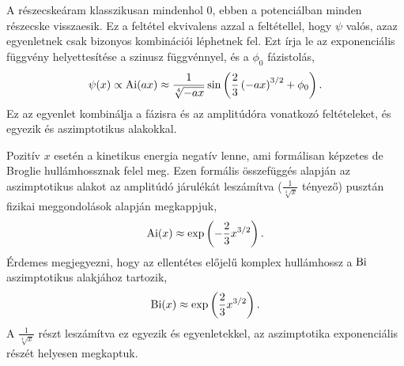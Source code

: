 A részecskeáram klasszikusan mindenhol $0$, ebben a potenciálban minden részecske visszaesik. Ez a feltétel ekvivalens azzal a feltétellel, hogy $\psi$ valós, azaz  egyenletnek csak bizonyos kombinációi léphetnek fel. Ezt írja le az exponenciális függvény helyettesítése a szinusz függvénnyel, és a $\phi_0$ fázistolás,
\begin{equation}
	\psi(x)\propto\operatorname{Ai}(ax)\approx\frac{1}{\sqrt[4]{-ax}}\sin\left(\frac{2}{3}\left(-ax\right)^{3/2}+\phi_0\right).
\end{equation}
Ez az egyenlet kombinálja a fázisra és az amplitúdóra vonatkozó feltételeket, és egyezik  és  aszimptotikus alakokkal.

Pozitív $x$ esetén a kinetikus energia negatív lenne, ami formálisan képzetes de Broglie hullámhossznak felel meg. Ezen formális összefüggés alapján az aszimptotikus alakot az amplitúdó járulékát leszámítva ($\frac{1}{\sqrt[4]{x}}$ tényező) pusztán fizikai meggondolások alapján megkappjuk,
\begin{equation}
	\operatorname{Ai}(x)\approx\exp\left(-\frac{2}{3}x^{3/2}\right).
\end{equation}
Érdemes megjegyezni, hogy az ellentétes előjelű komplex hullámhossz a $\operatorname{Bi}$ aszimptotikus alakjához tartozik,
\begin{equation}
	\operatorname{Bi}(x)\approx\exp\left(\frac{2}{3}x^{3/2}\right).
\end{equation}
A $\frac{1}{\sqrt[4]{x}}$ részt leszámítva ez egyezik  és  egyenletekkel, az aszimptotika exponenciális részét helyesen megkaptuk.


